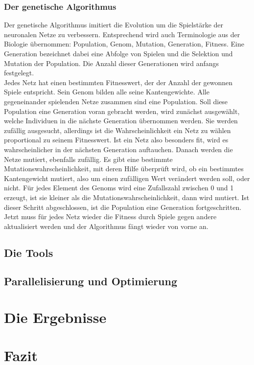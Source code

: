 \documentclass[12pt,a4paper]{article}
\begin{document}
\subsubsection{Der genetische Algorithmus}

Der genetische Algorithmus imitiert die Evolution um die Spielstärke der neuronalen Netze zu verbessern. Entsprechend wird auch Terminologie aus der Biologie übernommen: Population, Genom, Mutation, Generation, Fitness. Eine Generation bezeichnet dabei eine Abfolge von Spielen und die Selektion und Mutation der Population. Die Anzahl dieser Generationen wird anfangs festgelegt.
\\
Jedes Netz hat einen bestimmten Fitnesswert, der der Anzahl der gewonnen Spiele entspricht. Sein Genom bilden alle seine Kantengewichte. Alle gegeneinander spielenden Netze zusammen sind eine Population. Soll diese Population eine Generation voran gebracht werden, wird zunächst ausgewählt, welche Individuen in die nächste Generation übernommen werden. Sie werden zufällig ausgesucht, allerdings ist die Wahrscheinlichkeit ein Netz zu wählen proportional zu seinem Fitnesswert. Ist ein Netz also besonders fit, wird es wahrscheinlicher in der nächsten Generation auftauchen. Danach werden die Netze mutiert, ebenfalls zufällig. Es gibt eine bestimmte Mutationswahrscheinlichkeit, mit deren Hilfe überprüft wird, ob ein bestimmtes Kantengewicht mutiert, also um einen zufälligen Wert verändert werden soll, oder nicht. Für jedes Element des Genoms wird eine Zufallszahl zwischen 0 und 1 erzeugt, ist sie kleiner als die Mutationswahrscheinlichkeit, dann wird mutiert. Ist dieser Schritt abgeschlossen, ist die Population eine Generation fortgeschritten. Jetzt muss für jedes Netz wieder die Fitness durch Spiele gegen andere aktualisiert werden und der Algorithmus fängt wieder von vorne an.

\subsection{Die Tools}

\subsection{Parallelisierung und Optimierung}

\section{Die Ergebnisse}

\section{Fazit}
\end{document}
